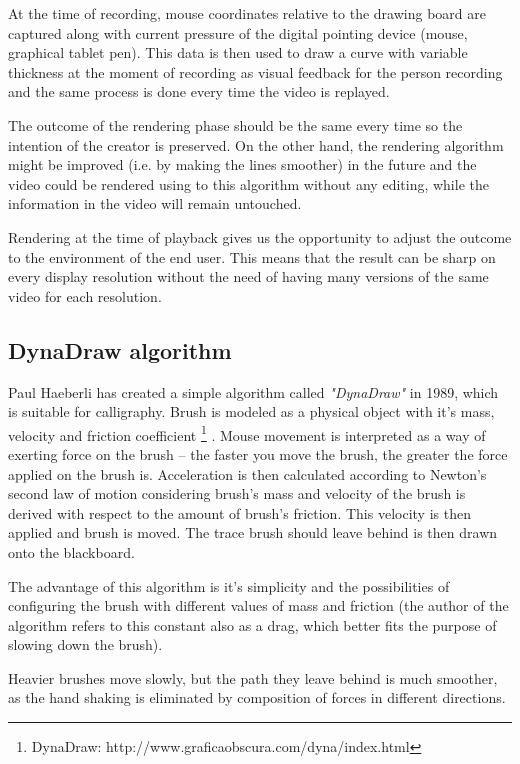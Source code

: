 At the time of recording, mouse coordinates relative to the drawing board are captured along with current pressure of the digital pointing device (mouse, graphical tablet pen). This data is then used to draw a curve with variable thickness at the moment of recording as visual feedback for the person recording and the same process is done every time the video is replayed.

The outcome of the rendering phase should be the same every time so the intention of the creator is preserved. On the other hand, the rendering algorithm might be improved (i.e. by making the lines smoother) in the future and the video could be rendered using to this algorithm without any editing, while the information in the video will remain untouched.

Rendering at the time of playback gives us the opportunity to adjust the outcome to the environment of the end user. This means that the result can be sharp on every display resolution without the need of having many versions of the same video for each resolution.

\subsection{DynaDraw algorithm}
\label{sec:dynadraw}

Paul Haeberli has created a simple algorithm called \textit{"DynaDraw"} in 1989, which is suitable for calligraphy. Brush is modeled as a physical object with it's mass, velocity and friction coefficient \footnote{DynaDraw: http://www.graficaobscura.com/dyna/index.html} \cite{}. Mouse movement is interpreted as a way of exerting force on the brush -- the faster you move the brush, the greater the force applied on the brush is. Acceleration is then calculated according to Newton's second law of motion considering brush's mass and velocity of the brush is derived with respect to the amount of brush's friction. This velocity is then applied and brush is moved. The trace brush should leave behind is then drawn onto the blackboard.

The advantage of this algorithm is it's simplicity and the possibilities of configuring the brush with different values of mass and friction (the author of the algorithm refers to this constant also as a drag, which better fits the purpose of slowing down the brush).

Heavier brushes move slowly, but the path they leave behind is much smoother, as the hand shaking is eliminated by composition of forces in different directions.

